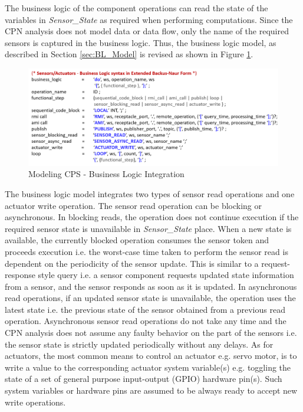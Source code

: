 The business logic of the component operations can read the state of the variables in \emph{Sensor\_State} as required when performing computations. Since the CPN analysis does not model data or data flow, only the name of the required sensors is captured in the business logic. Thus, the business logic model, as described in Section \ref{sec:BL_Model} is revised as shown in Figure \ref{fig:cps_bl}.

\begin{figure}[ht]
	\centering
	\includegraphics[width=\textwidth]{./img/cps_bl}
	\caption{Modeling CPS - Business Logic Integration}
	\label{fig:cps_bl}
\end{figure}
\FloatBarrier

The business logic model integrates two types of sensor read operations and one actuator write operation. The sensor read operation can be blocking or asynchronous. In blocking reads, the operation does not continue execution if the required sensor state is unavailable in \emph{Sensor\_State} place. When a new state is available, the currently blocked operation consumes the sensor token and proceeds execution i.e. the worst-case time taken to perform the sensor read is dependent on the periodicity of the sensor update. This is similar to a request-response style query i.e. a sensor component requests updated state information from a sensor, and the sensor responds as soon as it is updated. In asynchronous read operations, if an updated sensor state is unavailable, the operation uses the latest state i.e. the previous state of the sensor obtained from a previous read operation. Asynchronous sensor read operations do not take any time and the CPN analysis does not assume any faulty behavior on the part of the sensors i.e. the sensor state is strictly updated periodically without any delays. As for actuators, the most common means to control an actuator e.g. servo motor, is to write a value to the corresponding actuator system variable(s) e.g. toggling the state of a set of general purpose input-output (GPIO) hardware pin(s). Such system variables or hardware pins are assumed to be always ready to accept new write operations. 


  

